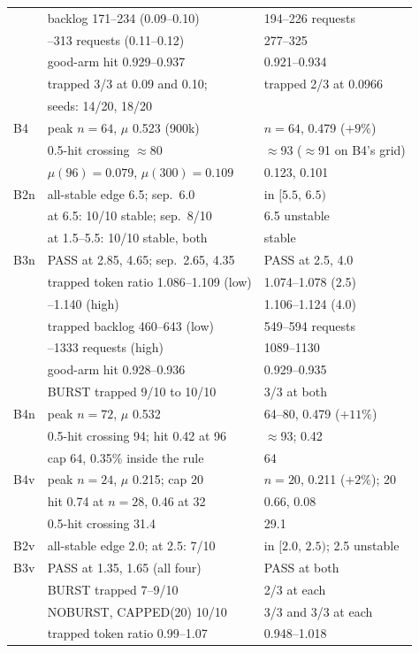 \begin{table}[!tp]
\begin{tabular}{@{}l l l@{}}
   & backlog 171--234 (0.09--0.10) & 194--226 requests\\
   & \quad 253--313 requests (0.11--0.12) & 277--325\\
   & good-arm hit 0.929--0.937 & 0.921--0.934\\
   & trapped 3/3 at 0.09 and 0.10; & trapped 2/3 at 0.0966\\
   & \quad 20 seeds: 14/20, 18/20 & \\
\addlinespace[1pt]
B4 & peak $n=64$, $\mu$ 0.523 (900k) & $n=64$, 0.479 ($+9\%$)\\
   & 0.5-hit crossing $\approx$80 & $\approx$93 ($\approx$91 on B4's grid)\\
   & $\mu(96)=0.079$, $\mu(300)=0.109$ & 0.123, 0.101\\
\midrule
B2n & all-stable edge 6.5; sep.\ 6.0 & in $[5.5,\,6.5)$\\
    & at 6.5: 10/10 stable; sep.\ 8/10 & 6.5 unstable\\
    & at 1.5--5.5: 10/10 stable, both & stable\\
\addlinespace[1pt]
B3n & PASS at 2.85, 4.65; sep.\ 2.65, 4.35 & PASS at 2.5, 4.0\\
    & trapped token ratio 1.086--1.109 (low) & 1.074--1.078 (2.5)\\
    & \quad 1.119--1.140 (high) & 1.106--1.124 (4.0)\\
    & trapped backlog 460--643 (low) & 549--594 requests\\
    & \quad 1067--1333 requests (high) & 1089--1130\\
    & good-arm hit 0.928--0.936 & 0.929--0.935\\
    & BURST trapped 9/10 to 10/10 & 3/3 at both\\
\addlinespace[1pt]
B4n & peak $n=72$, $\mu$ 0.532 & 64--80, 0.479 ($+11\%$)\\
    & 0.5-hit crossing 94; hit 0.42 at 96 & $\approx$93; 0.42\\
    & cap 64, 0.35\% inside the rule & 64\\
\midrule
B4v & peak $n=24$, $\mu$ 0.215; cap 20 & $n=20$, 0.211 ($+2\%$); 20\\
    & hit 0.74 at $n=28$, 0.46 at 32 & 0.66, 0.08\\
    & 0.5-hit crossing 31.4 & 29.1\\
\addlinespace[1pt]
B2v & all-stable edge 2.0; at 2.5: 7/10 & in $[2.0,\,2.5)$; 2.5 unstable\\
\addlinespace[1pt]
B3v & PASS at 1.35, 1.65 (all four) & PASS at both\\
    & BURST trapped 7--9/10 & 2/3 at each\\
    & NOBURST, CAPPED(20) 10/10 & 3/3 and 3/3 at each\\
    & trapped token ratio 0.99--1.07 & 0.948--1.018\\
\bottomrule
\end{tabular}
\end{table}

